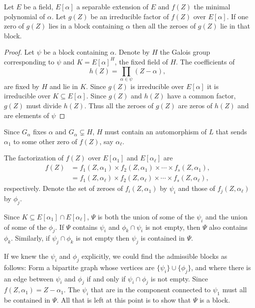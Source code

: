 \begin{proposition}
Let $E$ be a field, $E[\alpha]$ a separable extension of $E$ and
$f(Z)$ the minimal polynomial of $\alpha$.  Let $g(Z)$ be an
irreducible factor of $f(Z)$ over $E[\alpha]$.  If one zero of $g(Z)$
lies in a block containing $\alpha$ then all the zeroes of $g(Z)$ lie
in that block.
\end{proposition}

\begin{proof}
Let $\psi$ be a block containing $\alpha$.  Denote by $H$ the Galois
group corresponding to $\psi$ and $K = E[\alpha]^H$, the fixed field
of $H$.  The coefficients of
\[
h(Z) = \prod_{\alpha \in \psi}\left(Z - \alpha\right),
\]
are fixed by $H$ and lie in $K$.  Since $g(Z)$ is irreducible over
$E[\alpha]$ it is irreducible over $K \subseteq E[\alpha]$.  Since
$g(Z)$ and $h(Z)$ have a common factor, $g(Z)$ must divide $h(Z)$.
Thus all the zeroes of $g(Z)$ are zeros of $h(Z)$ and are elements of
$\psi$
\end{proof}

Since $G_{\alpha}$ fixes $\alpha$ and $G_{\alpha} \varsubsetneq H$,
$H$ must contain an automorphism of $L$ that sends $\alpha_1$ to some
other zero of $f(Z)$, say $\alpha_{\ell}$.

The factorization of $f(Z)$ over $E[\alpha_1]$ and $E[\alpha_\ell]$
are
\[
\begin{aligned}
f(Z) & = f_1(Z, \alpha_1) \times f_2(Z, \alpha_1) \times \cdots
  \times f_s(Z, \alpha_1), \\
     & = f_1(Z, \alpha_{\ell}) \times f_2(Z, \alpha_{\ell}) \times \cdots
  \times f_s(Z, \alpha_{\ell}), 
\end{aligned}
\]
respectively.  Denote the set of zeroes of $f_i(Z, \alpha_1)$ by
$\psi_i$ and those of $f_j(Z, \alpha_{\ell})$ by $\phi_j$.  

Since $K \subseteq E[\alpha_1] \cap E[\alpha_{\ell}]$, $\Psi$ is both
the union of some of the $\psi_i$ and the union of some of the
$\phi_j$.  If $\Psi$ contains $\psi_i$ and $\phi_k \cap \psi_i$ is not
empty, then $\Psi$ also contains $\phi_k$.  Similarly, if $\psi_j \cap
\phi_k$ is not empty then $\psi_j$ is contained in $\Psi$.  

If we knew the $\psi_i$ and $\phi_j$ explicitly, we could find the
admissible blocks as follows:  Form a bipartite graph whose vertices
are  $\{\psi_i\} \cup \{\phi_j\}$, and where there is an edge between
$\psi_i$ and $\phi_j$ if and only if $\psi_i \cap \phi_j$ is not empty.
Since $f(Z, \alpha_1) = Z - \alpha_1$.  The $\psi_i$ that are in the
component connected to $\psi_1$ must all be contained in $\Psi$.
All that is left at this point is to show that $\Psi$ is a block.

